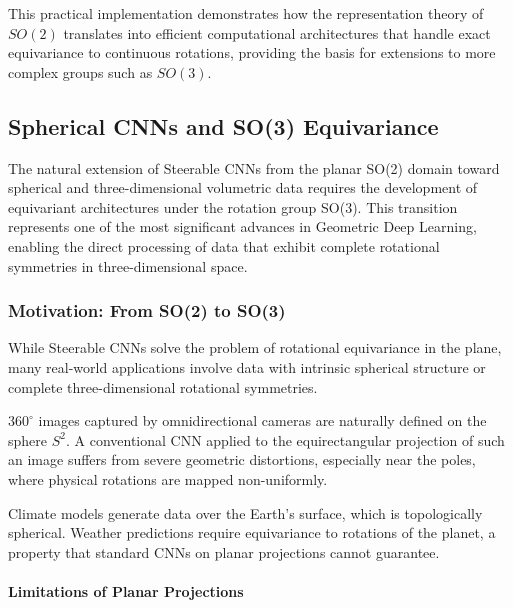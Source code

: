 This practical implementation demonstrates how the representation theory of $SO(2)$ translates into efficient computational architectures that handle exact equivariance to continuous rotations, providing the basis for extensions to more complex groups such as $SO(3)$.
\subsection{Spherical CNNs and SO(3) Equivariance}\label{subsec:spherical_cnns_so3}

The natural extension of Steerable CNNs from the planar SO(2) domain toward spherical and three-dimensional volumetric data requires the development of equivariant architectures under the rotation group SO(3). This transition represents one of the most significant advances in Geometric Deep Learning, enabling the direct processing of data that exhibit complete rotational symmetries in three-dimensional space.

\subsubsection{Motivation: From SO(2) to SO(3)}

While Steerable CNNs solve the problem of rotational equivariance in the plane, many real-world applications involve data with intrinsic spherical structure or complete three-dimensional rotational symmetries.

\begin{example}
$360^\circ$ images captured by omnidirectional cameras are naturally defined on the sphere $S^2$. A conventional CNN applied to the equirectangular projection of such an image suffers from severe geometric distortions, especially near the poles, where physical rotations are mapped non-uniformly.
\end{example}

\begin{example}
Climate models generate data over the Earth's surface, which is topologically spherical. Weather predictions require equivariance to rotations of the planet, a property that standard CNNs on planar projections cannot guarantee.
\end{example}

\paragraph{Limitations of Planar Projections}

